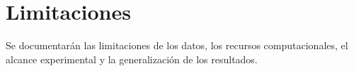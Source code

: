 \section{Limitaciones}

Se documentarán las limitaciones de los datos, los recursos computacionales, el alcance experimental y la generalización de los resultados.
